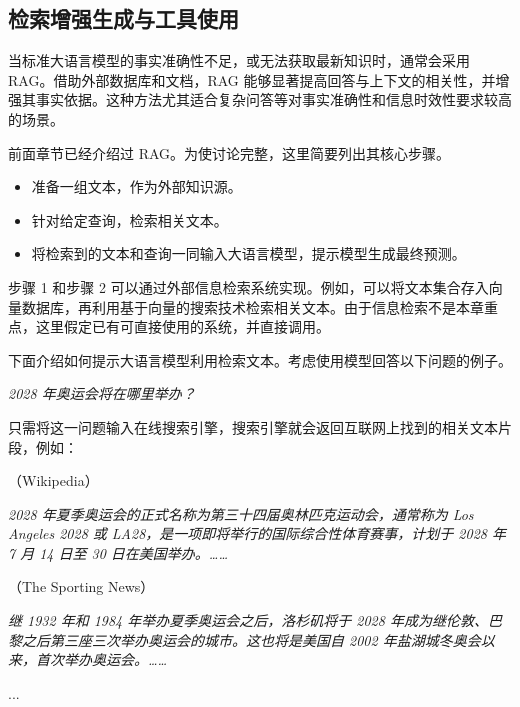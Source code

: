 \subsection{检索增强生成与工具使用}
\label{sec:rag-and-tool-use}

\noindent 当标准大语言模型的事实准确性不足，或无法获取最新知识时，通常会采用 RAG。借助外部数据库和文档，RAG 能够显著提高回答与上下文的相关性，并增强其事实依据。这种方法尤其适合复杂问答等对事实准确性和信息时效性要求较高的场景。

前面章节已经介绍过 RAG。为使讨论完整，这里简要列出其核心步骤。

\begin{itemize}
\item \vspace{0.5em} 准备一组文本，作为外部知识源。
\item \vspace{0.3em} 针对给定查询，检索相关文本。
\item \vspace{0.3em} 将检索到的文本和查询一同输入大语言模型，提示模型生成最终预测。
\end{itemize}
\vspace{0.5em}

步骤 1 和步骤 2 可以通过外部信息检索系统实现。例如，可以将文本集合存入向量数据库，再利用基于向量的搜索技术检索相关文本。由于信息检索不是本章重点，这里假定已有可直接使用的系统，并直接调用。

下面介绍如何提示大语言模型利用检索文本。考虑使用模型回答以下问题的例子。

\begin{center}
\textit{2028 年奥运会将在哪里举办？}
\end{center}

只需将这一问题输入在线搜索引擎，搜索引擎就会返回互联网上找到的相关文本片段，例如：

\begin{flushleft}
\begingroup
\setlength{\leftskip}{2em}
\setlength{\rightskip}{2em}

（Wikipedia）

\textit{2028 年夏季奥运会的正式名称为第三十四届奥林匹克运动会，通常称为 Los Angeles 2028 或 LA28，是一项即将举行的国际综合性体育赛事，计划于 2028 年 7 月 14 日至 30 日在美国举办。……}

\vspace{0.5em}
（The Sporting News）

\textit{继 1932 年和 1984 年举办夏季奥运会之后，洛杉矶将于 2028 年成为继伦敦、巴黎之后第三座三次举办奥运会的城市。这也将是美国自 2002 年盐湖城冬奥会以来，首次举办奥运会。……}

\vspace{0.5em}

...

\endgroup
\end{flushleft}

